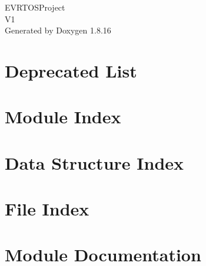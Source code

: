 \let\mypdfximage\pdfximage\def\pdfximage{\immediate\mypdfximage}\documentclass[twoside]{book}
\newcommand{\+}{\discretionary{\mbox{\scriptsize$\hookleftarrow$}}{}{}}
\newcommand{\clearemptydoublepage}{%
  \newpage{\pagestyle{empty}\cleardoublepage}%
}
\begin{document}
\hypersetup{pageanchor=false,
             bookmarksnumbered=true,
             pdfencoding=unicode
            }
\begin{titlepage}
\vspace*{7cm}
\begin{center}%
{\Large E\+V\+R\+T\+O\+S\+Project \\[1ex]\large V1 }\\
\vspace*{1cm}
{\large Generated by Doxygen 1.8.16}\\
\end{center}
\end{titlepage}
\clearemptydoublepage
{}
\tableofcontents
\clearemptydoublepage
{}
\hypersetup{pageanchor=true}

\chapter{Deprecated List}
\label{deprecated}

\chapter{Module Index}

\chapter{Data Structure Index}

\chapter{File Index}

\chapter{Module Documentation}
















\end{document}
